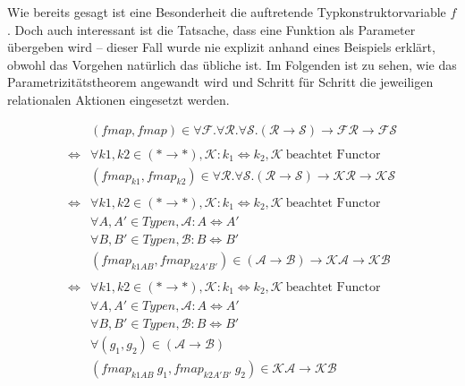 Wie bereits gesagt ist eine Besonderheit die auftretende Typkonstruktorvariable $f$. Doch auch interessant ist die Tatsache, dass
eine Funktion als Parameter übergeben wird -- dieser Fall wurde nie explizit anhand eines Beispiels erklärt, obwohl das Vorgehen
natürlich das übliche ist.
Im Folgenden ist zu sehen, wie das Parametrizitätstheorem angewandt wird und Schritt für Schritt die jeweiligen relationalen Aktionen
eingesetzt werden.


\begin{align*}
&(fmap, fmap) \in \forall \mathcal{F} . \forall \mathcal{R} . \forall \mathcal{S} . (\mathcal{R} \rightarrow \mathcal{S})
\rightarrow \mathcal{F} \mathcal{R} \rightarrow \mathcal{F} \mathcal{S} \\
&\\
\Leftrightarrow &
\forall k1, k2 \in (* \rightarrow *), \mathcal{K} : k_1 \Leftrightarrow k_2, \mathcal{K}~\text{beachtet Functor} \\
&(fmap_{k1}, fmap_{k2}) \in \forall \mathcal{R} . \forall \mathcal{S} . (\mathcal{R} \rightarrow \mathcal{S}) \rightarrow
\mathcal{K} \mathcal{R} \rightarrow \mathcal{K} \mathcal{S} \\
&\\
\Leftrightarrow &
\forall k1, k2 \in (* \rightarrow *), \mathcal{K} : k_1 \Leftrightarrow k_2, \mathcal{K}~\text{beachtet Functor} \\
&\forall A, A' \in Typen, \mathcal{A} : A \Leftrightarrow A' \\
&\forall B, B' \in Typen, \mathcal{B} : B \Leftrightarrow B' \\
&(fmap_{k1 A B}, fmap_{k2 A' B'}) \in (\mathcal{A} \rightarrow \mathcal{B}) \rightarrow
\mathcal{K} \mathcal{A} \rightarrow \mathcal{K} \mathcal{B} \\
&\\
\Leftrightarrow &
\forall k1, k2 \in (* \rightarrow *), \mathcal{K} : k_1 \Leftrightarrow k_2, \mathcal{K}~\text{beachtet Functor} \\
&\forall A, A' \in Typen, \mathcal{A} : A \Leftrightarrow A' \\
&\forall B, B' \in Typen, \mathcal{B} : B \Leftrightarrow B' \\
&\forall (g_1, g_2) \in (\mathcal{A} \rightarrow \mathcal{B}) \\
&(fmap_{k1 A B}\ g_1, fmap_{k2 A' B'}\ g_2) \in \mathcal{K} \mathcal{A} \rightarrow \mathcal{K} \mathcal{B} \\
\end{align*}

